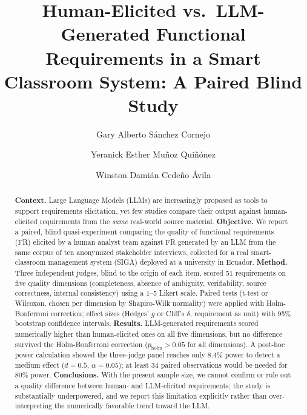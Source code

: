 \documentclass{llncs}
\begin{document}
\title{Human-Elicited vs.\ LLM-Generated Functional Requirements in a Smart Classroom System: A Paired Blind Study}

\author{Gary Alberto S\'anchez Cornejo \and
Yeranick Esther Mu\~noz Qui\~n\'onez \and
Winston Dami\'an Cede\~no \'Avila}


\maketitle

\begin{abstract}
\sloppy
\textbf{Context.} Large Language Models (LLMs) are increasingly proposed as tools to
support requirements elicitation, yet few studies compare their output against
human-elicited requirements from the \emph{same} real-world source material.
\textbf{Objective.} We report a paired, blind quasi-experiment comparing the quality
of functional requirements (FR) elicited by a human analyst team against FR generated
by an LLM from the same corpus of ten anonymized stakeholder interviews, collected for
a real smart-classroom management system (SIGA) deployed at a university in Ecuador.
\textbf{Method.} Three independent judges, blind to the origin of each item, scored 51
requirements on five quality dimensions (completeness, absence of ambiguity,
verifiability, source correctness, internal consistency) using a 1--5 Likert scale.
Paired tests (t-test or Wilcoxon, chosen per dimension by Shapiro-Wilk normality) were
applied with Holm-Bonferroni correction; effect sizes (Hedges' $g$ or Cliff's $\delta$,
requirement as unit) with 95\% bootstrap confidence intervals.
\textbf{Results.} LLM-generated requirements scored numerically higher than
human-elicited ones on all five dimensions, but no difference survived the Holm-Bonferroni
correction ($p_{\text{holm}} > 0.05$ for all dimensions). A post-hoc power calculation
showed the three-judge panel reaches only 8.4\% power to detect a medium effect
($d=0.5$, $\alpha=0.05$); at least 34 paired observations would be needed for 80\% power.
\textbf{Conclusions.} With the present sample size, we cannot confirm or rule out a
quality difference between human- and LLM-elicited requirements; the study is
substantially underpowered, and we report this limitation explicitly rather than
over-interpreting the numerically favorable trend toward the LLM.
\end{abstract}
\end{document}
